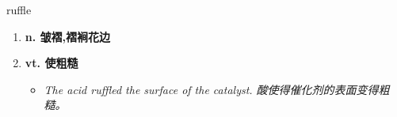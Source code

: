 
\begin{frame}
{\huge ruffle}
\begin{center}
\begin{enumerate}\Large
  \item \textbf{n. 皱褶,褶裥花边}
  \item \textbf{vt. 使粗糙}
  \begin{itemize}
    \item \em{\Large{The acid ruffled the surface of the catalyst. 酸使得催化剂的表面变得粗糙。}}
  \end{itemize}
\end{enumerate}
\end{center}
\end{frame}
